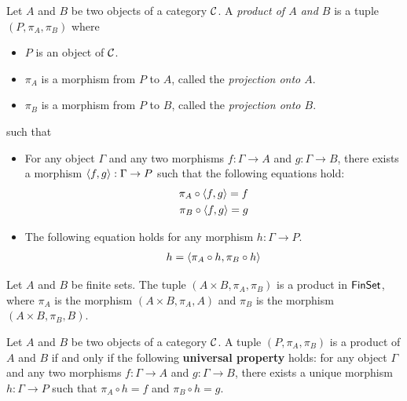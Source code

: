 \begin{definition}[Product]
  Let \(A\) and \(B\) be two objects of a category \(\mathcal C\).
  A \emph{product of \(A\) and \(B\)}
  is a tuple \((P,\pi_A,\pi_B)\)
  where
  \begin{itemize}
  \item \(P\) is an object of \(\mathcal C\).
  \item \(\pi_A\) is a morphism from \(P\) to \(A\),
    called the \emph{projection onto \(A\)}.
  \item \(\pi_B\) is a morphism from \(P\) to \(B\),
    called the \emph{projection onto \(B\)}.
  \end{itemize}
  such that
  \begin{itemize}
  \item For any object \(\Gamma\) and any two morphisms \(f : \Gamma \to A\)
    and \(g : \Gamma \to B\),
    there exists a morphism \(\langle f,g\rangle : \Gamma \to P\)
    such that the following equations hold:
    \begin{align}
      \pi_A \circ \langle f,g\rangle = f \\
      \pi_B \circ \langle f,g\rangle = g
    \end{align}
  \item The following equation holds for any morphism \(h : \Gamma \to P\).
    \begin{align}
      h = \langle \pi_A \circ h, \pi_B \circ h\rangle
    \end{align}
  \end{itemize}
\end{definition}

\begin{proposition}
  Let \(A\) and \(B\) be finite sets.
  The tuple \((A \times B, \pi_A, \pi_B)\)
  is a product in \(\mathsf{FinSet}\),
  where \(\pi_A\) is the morphism \((A\times B,\pi_A, A)\)
  and \(\pi_B\) is the morphism \((A \times B,\pi_B,B)\).
\end{proposition}

\begin{proposition}
  Let \(A\) and \(B\) be two objects of a category \(\mathcal C\).
  A tuple \((P,\pi_A,\pi_B)\) is a product of \(A\) and \(B\)
  if and only if the following \textbf{universal property}
  holds:
  for any object \(\Gamma\) and any two morphisms \(f : \Gamma \to A\)
  and \(g : \Gamma \to B\),
  there exists a unique morphism \(h : \Gamma \to P\)
  such that \(\pi_A \circ h = f\) and \(\pi_B \circ h = g\).
\end{proposition}

